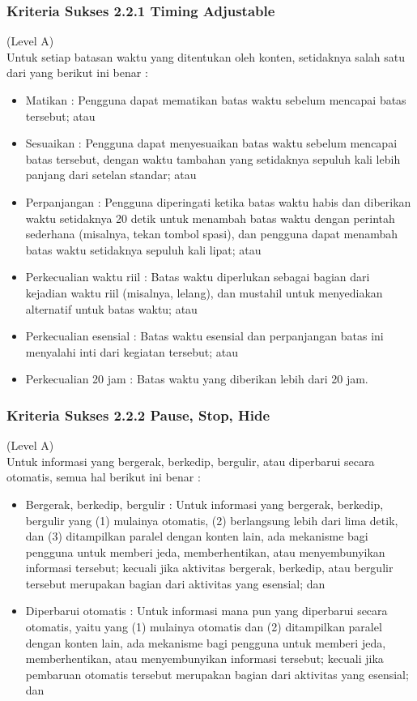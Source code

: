 \subsubsection{Kriteria Sukses 2.2.1 Timing Adjustable}
\label{sec:kriteria_2.2.1}
(Level A) \\

Untuk setiap batasan waktu yang ditentukan oleh konten, setidaknya salah satu dari yang berikut ini benar :

\begin{itemize}
	\item Matikan : Pengguna dapat mematikan batas waktu sebelum mencapai batas tersebut; atau
	\item Sesuaikan : Pengguna dapat menyesuaikan batas waktu sebelum mencapai batas tersebut, dengan waktu tambahan yang setidaknya sepuluh kali lebih panjang dari setelan standar; atau
	\item Perpanjangan : Pengguna diperingati ketika batas waktu habis dan diberikan waktu setidaknya 20 detik untuk menambah batas waktu dengan perintah sederhana (misalnya, tekan tombol spasi), dan pengguna dapat menambah batas waktu setidaknya sepuluh kali lipat; atau
	\item Perkecualian waktu riil : Batas waktu diperlukan sebagai bagian dari kejadian waktu riil (misalnya, lelang), dan mustahil untuk menyediakan alternatif untuk batas waktu; atau
	\item Perkecualian esensial : Batas waktu esensial dan perpanjangan batas ini menyalahi inti dari kegiatan tersebut; atau
	\item Perkecualian 20 jam : Batas waktu yang diberikan lebih dari 20 jam.
\end{itemize}

\subsubsection{Kriteria Sukses 2.2.2 Pause, Stop, Hide}
\label{sec:kriteria_2.2.2}
(Level A) \\

Untuk informasi yang bergerak, berkedip, bergulir, atau diperbarui secara otomatis, semua hal berikut ini benar :

\begin{itemize}
	\item Bergerak, berkedip, bergulir : Untuk informasi yang bergerak, berkedip, bergulir yang (1) mulainya otomatis, (2) berlangsung lebih dari lima detik, dan (3) ditampilkan paralel dengan konten lain, ada mekanisme bagi pengguna untuk memberi jeda, memberhentikan, atau menyembunyikan informasi tersebut; kecuali jika aktivitas bergerak, berkedip, atau bergulir tersebut merupakan bagian dari aktivitas yang esensial; dan
	\item Diperbarui otomatis : Untuk informasi mana pun yang diperbarui secara otomatis, yaitu yang (1) mulainya otomatis dan (2) ditampilkan paralel dengan konten lain, ada mekanisme bagi pengguna untuk memberi jeda, memberhentikan, atau menyembunyikan informasi tersebut; kecuali jika pembaruan otomatis tersebut merupakan bagian dari aktivitas yang esensial; dan
\end{itemize}

